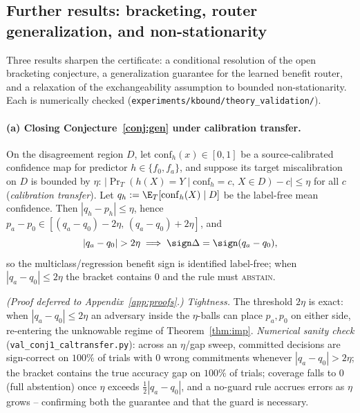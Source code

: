 \subsection{Further results: bracketing, router generalization, and non-stationarity}\label{sec:theory-ext}
Three results sharpen the certificate: a conditional resolution of the open bracketing
conjecture, a generalization guarantee for the learned benefit router, and a relaxation of the
exchangeability assumption to bounded non-stationarity. Each is numerically checked
(\texttt{experiments/kbound/theory\_validation/}).

\paragraph{(a) Closing Conjecture~\ref{conj:gen} under calibration transfer.}
\begin{theorem}\label{thm:caltransfer}
On the disagreement region $D$, let $\mathrm{conf}_h(x)\in[0,1]$ be a source-calibrated confidence
map for predictor $h\in\{f_0,f_a\}$, and suppose its target miscalibration on $D$ is bounded by
$\eta$: $|\Pr_T(h(X){=}Y\mid \mathrm{conf}_h{=}c,\,X\in D)-c|\le\eta$ for all $c$
(\emph{calibration transfer}). Let $q_h:=\E_T[\mathrm{conf}_h(X)\mid D]$ be the label-free mean
confidence. Then $|q_h-p_h|\le\eta$, hence $p_a-p_0\in[(q_a-q_0)-2\eta,\,(q_a-q_0)+2\eta]$, and
\[
|q_a-q_0|>2\eta \;\Longrightarrow\; \sign\Delta=\sign(q_a-q_0),
\]
so the multiclass/regression benefit sign is identified label-free; when $|q_a-q_0|\le2\eta$ the
bracket contains $0$ and the rule must \textsc{abstain}.
\end{theorem}
\emph{(Proof deferred to Appendix~\ref{app:proofs}.)}
\noindent\emph{Tightness.} The threshold $2\eta$ is exact: when $|q_a-q_0|\le2\eta$ an adversary
inside the $\eta$-balls can place $p_a,p_0$ on either side, re-entering the unknowable regime of
Theorem~\ref{thm:imp}. \emph{Numerical sanity check} (\texttt{val\_conj1\_caltransfer.py}): across
an $\eta$/gap sweep, committed decisions are sign-correct on $100\%$ of trials with $0$ wrong
commitments whenever $|q_a-q_0|>2\eta$; the bracket contains the true accuracy gap on $100\%$ of
trials; coverage falls to $0$ (full abstention) once $\eta$ exceeds $\tfrac12|q_a-q_0|$, and a
no-guard rule accrues errors as $\eta$ grows -- confirming both the guarantee and that the guard is
necessary.

